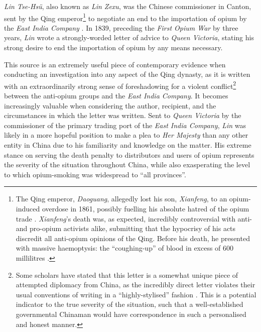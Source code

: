 \documentclass{article}
\begin{document}
        \textit{Lin Tse-Hs\"u}, also known as \textit{Lin Zexu}, was the Chinese commissioner in Canton, sent by the Qing emperor\footnote{The Qing emperor, \textit{Daoguang}, allegedly lost his son, \textit{Xianfeng}, to an opium-induced overdose in 1861, possibly fuelling his absolute hatred of the opium trade \autocite{Ringmar:2013}. \textit{Xianfeng}'s death was, as expected, incredibly controversial with anti- and pro-opium activists alike, submitting that the hypocrisy of his acts discredit all anti-opium opinions of the Qing. Before his death, he presented with massive haemoptysis: the ``coughing-up'' of blood in excess of 600 millilitres \autocite{Sabatine:2013}.} to negotiate an end to the importation of opium by the \textit{East India Company} \autocite{ChinaHistoricalArchives:1992}. In 1839, preceding the \textit{First Opium War} by three years, \textit{Lin} wrote a strongly-worded letter of advice to \textit{Queen Victoria}, stating his strong desire to end the importation of opium by any means necessary.


        This source is an extremely useful piece of contemporary evidence when conducting an investigation into any aspect of the Qing dynasty, as it is written with an extraordinarily strong sense of foreshadowing for a violent conflict\footnote{Some scholars have stated that this letter is a somewhat unique piece of attempted diplomacy from China, as the incredibly direct letter violates their usual conventions of writing in a ``highly-stylised'' fashion \autocite{Kishlansky:1995}. This is a potential indicator to the true severity of the situation, such that a well-established governmental Chinaman would have correspondence in such a personalised and honest manner.} between the anti-opium groups and the \textit{East India Company}. It becomes increasingly valuable when considering the author, recipient, and the circumstances in which the letter was written. Sent to \textit{Queen Victoria} by the commissioner of the primary trading port of the \textit{East India Company}, \textit{Lin} was likely in a more hopeful position to make a plea to \textit{Her Majesty} than any other entity in China due to his familiarity and knowledge on the matter. His extreme stance on serving the death penalty to distributors and users of opium represents the severity of the situation throughout China, while also exasperating the level to which opium-smoking was widespread to ``all provinces''.
\end{document}
